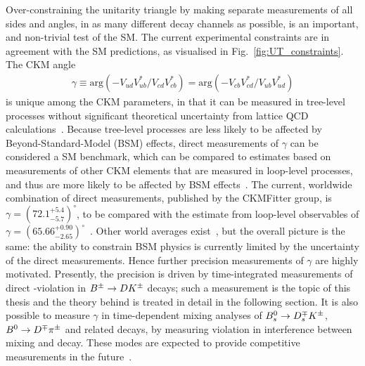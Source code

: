 Over-constraining the unitarity triangle by making separate measurements of all sides and angles, in as many different decay channels as possible, is an important, and non-trivial test of the SM. The current experimental constraints are in agreement with the SM predictions, as visualised in Fig.~\ref{fig:UT_constraints}. 
The CKM angle
\begin{align}\label{eq:gamma_definition}
    \gamma \equiv \mathrm{arg} (-V_{ud}^{\phantom{*}}V_{ub}^*/V_{cd}^{\phantom{*}}V_{cb}^*)
    = \mathrm{arg} (-V_{cb}^{\phantom{*}}V_{cd}^*/V_{ub}^{\phantom{*}}V_{ud}^*)
\end{align}
is unique among the CKM parameters, in that it can be measured in tree-level processes without significant theoretical uncertainty from lattice QCD calculations~\cite{brodUltimateTheoreticalError2014}.  Because tree-level processes are less likely to be affected by Beyond-Standard-Model (BSM) effects, direct measurements of $\gamma$ can be considered a SM benchmark, which can be compared to estimates based on measurements of other CKM elements that are measured in loop-level processes, and thus are more likely to be affected by BSM effects~\cite{blankeEmergingDeltaDMdanomaly2019}. 
The current, worldwide combination of direct measurements, published by the CKMFitter group, is $\gamma = (72.1^{+5.4}_{-5.7})^\circ $, to be compared with the estimate from loop-level observables of $\gamma = (65.66^{+0.90}_{-2.65})^\circ $~\cite{CKMfitter2015}. Other world averages exist~\cite{HFLAV,UTfit-UT}, but the overall picture is the same: the ability to constrain BSM physics is currently limited by the uncertainty of the direct measurements. Hence further precision measurements of $\gamma$ are highly motivated. Presently, the precision is driven by time-integrated measurements of direct \CP-violation in ${{B}^\pm}\rightarrow{\ensuremath{D}}{\ensuremath{{K}^\pm}}$ decays; such a measurement is the topic of this thesis and the theory behind is treated in detail in the following section. It is also possible to measure $\gamma$ in time-dependent mixing analyses of ${{B}^0_{s}}\rightarrow{\ensuremath{{D}^{\mp}_{s}}}{\ensuremath{{K}^\pm}}$, ${{B}^0}\rightarrow{\ensuremath{{D}^\mp}}{\ensuremath{{\pi}^\pm}}$ and related decays, by measuring \CP violation in interference between mixing and decay. These modes are expected to provide competitive measurements in the future~\cite{kouBelleIIPhysics2019,lhcbcollaborationPhysicsCaseLHCb2019}.


